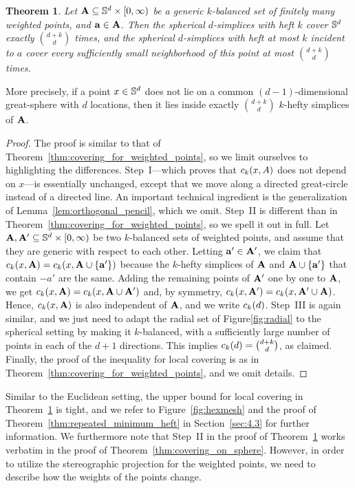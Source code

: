 \documentclass[10pt,a4paper]{article}
\newtheorem{theorem}{Theorem}[section]
\newcommand {\mm}[1] {\ifmmode{#1}\else{\mbox{\(#1\)}}\fi}
\theoremstyle{plain}
\newcommand{\Sspace}        {\mm{{\mathbb S}}}
\newcommand{\AAA}           {\mm{\bf A}}
\newcommand{\aaa}           {\mm{\bf a}}
\newcommand{\cover}[2]      {\mm{{c}_{#1}{({#2})}}}
\begin{document}
\begin{theorem}
  \label{thm:covering_on_sphere_weighted_case}
  Let $\AAA \subseteq \Sspace^d \times [0, \infty)$ be a generic $k$-balanced set of finitely many weighted points, and $\aaa \in \AAA$.
  Then the spherical $d$-simplices with heft $k$ cover $\Sspace^d$ exactly $\binom{d+k}{d}$ times, and the spherical $d$-simplices with heft at most $k$ incident to $a$ cover every sufficiently small neighborhood of this point at most $\binom{d+k}{d}$ times.
\end{theorem}
More precisely, if a point $x \in \Sspace^d$ does not lie on a common $(d-1)$-dimensional great-sphere with $d$ locations, then it lies inside exactly $\binom{d+k}{d}$ $k$-hefty simplices of $\AAA$.
\begin{proof}
  The proof is similar to that of Theorem~\ref{thm:covering_for_weighted_points}, so we limit ourselves to highlighting the differences.
  Step~I---which proves that $\cover{k}{x,A}$ does not depend on $x$---is essentially unchanged, except that we move along a directed great-circle instead of a directed line.
  An important technical ingredient is the generalization of Lemma~\ref{lem:orthogonal_pencil}, which we omit.
  \smallskip
  Step~II is different than in Theorem~\ref{thm:covering_for_weighted_points}, so we spell it out in full.
  Let $\AAA, \AAA' \subseteq \Sspace^d \times [0,\infty)$ be two $k$-balanced sets of weighted points, and assume that they are generic with respect to each other. 
  Letting $\aaa' \in \AAA'$, we claim that $\cover{k}{x, \AAA} = \cover{k}{x, \AAA \cup \{\aaa'\}}$ because the $k$-hefty simplices of $\AAA$ and $\AAA \cup \{\aaa'\}$ that contain $- a'$ are the same.
  Adding the remaining points of $\AAA'$ one by one to $\AAA$, we get $\cover{k}{x, \AAA} = \cover{k}{x, \AAA \cup \AAA'}$ and, by symmetry, $\cover{k}{x, \AAA'} = \cover{k}{x, \AAA' \cup \AAA}$.
  Hence, $\cover{k}{x, \AAA}$ is also independent of $\AAA$, and we write $\cover{k}{d}$.
  \smallskip
  Step~III is again similar, and we just need to adapt the radial set of Figure\ref{fig:radial} to the spherical setting by making it $k$-balanced, with a sufficiently large number of points in each of the $d+1$ directions.
  This implies $\cover{k}{d} = \binom{d+k}{d}$, as claimed.
  Finally, the proof of the inequality for local covering is as in Theorem~\ref{thm:covering_for_weighted_points}, and we omit details.
\end{proof}
Similar to the Euclidean setting, the upper bound for local covering in Theorem~\ref{thm:covering_on_sphere_weighted_case} is tight, and we refer to Figure~\ref{fig:hexmesh} and the proof of Theorem~\ref{thm:repeated_minimum_heft} in Section~\ref{sec:4.3} for further information.
%
We furthermore note that Step~II in the proof of Theorem~\ref{thm:covering_on_sphere_weighted_case} works verbatim in the proof of Theorem~\ref{thm:covering_on_sphere}.
However, in order to utilize the stereographic projection for the weighted points, we need to describe how the weights of the points change.
\end{document}
